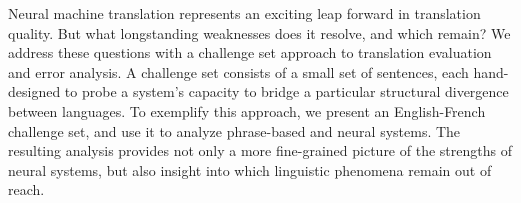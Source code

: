 Neural machine translation represents an exciting leap forward in translation quality. But what longstanding weaknesses does it resolve, and which remain? We address these questions with a challenge set approach to translation evaluation and error analysis. A challenge set consists of a small set of sentences, each hand-designed to probe a system's capacity to bridge a particular structural divergence between languages.  To exemplify this approach, we present an English-French challenge set, and use it to analyze phrase-based and neural systems. The resulting analysis provides not only a more fine-grained picture of the strengths of neural systems, but also insight into which linguistic phenomena remain out of reach.
